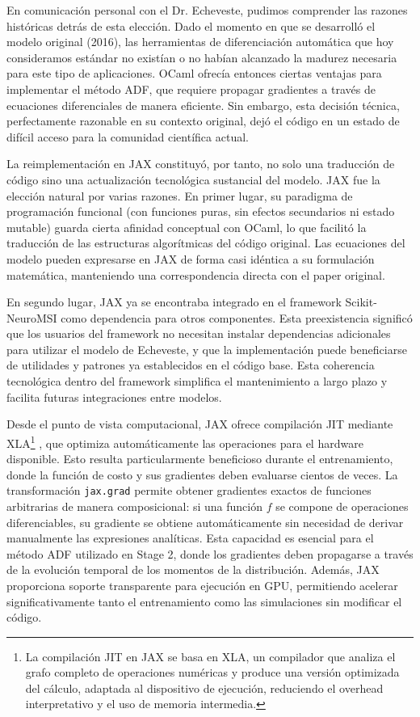 En comunicación personal con el Dr. Echeveste, pudimos comprender las razones históricas detrás de esta elección. Dado el momento en que se desarrolló el modelo original (2016), las herramientas de diferenciación automática que hoy consideramos estándar no existían o no habían alcanzado la madurez necesaria para este tipo de aplicaciones. OCaml ofrecía entonces ciertas ventajas para implementar el método \acrshort{ADF}, que requiere propagar gradientes a través de ecuaciones diferenciales de manera eficiente. Sin embargo, esta decisión técnica, perfectamente razonable en su contexto original, dejó el código en un estado de difícil acceso para la comunidad científica actual.

La reimplementación en JAX constituyó, por tanto, no solo una traducción de código sino una actualización tecnológica sustancial del modelo. JAX fue la elección natural por varias razones. En primer lugar, su paradigma de programación funcional (con funciones puras, sin efectos secundarios ni estado mutable) guarda cierta afinidad conceptual con OCaml, lo que facilitó la traducción de las estructuras algorítmicas del código original. Las ecuaciones del modelo pueden expresarse en JAX de forma casi idéntica a su formulación matemática, manteniendo una correspondencia directa con el paper original.

En segundo lugar, JAX ya se encontraba integrado en el framework Scikit-NeuroMSI como dependencia para otros componentes. Esta preexistencia significó que los usuarios del framework no necesitan instalar dependencias adicionales para utilizar el modelo de Echeveste, y que la implementación puede beneficiarse de utilidades y patrones ya establecidos en el código base. Esta coherencia tecnológica dentro del framework simplifica el mantenimiento a largo plazo y facilita futuras integraciones entre modelos.

Desde el punto de vista computacional, JAX ofrece compilación \acrlong{JIT} mediante \acrshort{XLA}\footnote{
La compilación \acrshort{JIT} en JAX se basa en \acrfull{XLA}, un compilador que analiza el grafo completo de operaciones numéricas y produce una versión optimizada del cálculo, adaptada al dispositivo de ejecución, reduciendo el overhead interpretativo y el uso de memoria intermedia.
}
, que optimiza automáticamente las operaciones para el hardware disponible. Esto resulta particularmente beneficioso durante el entrenamiento, donde la función de costo y sus gradientes deben evaluarse cientos de veces. La transformación \texttt{jax.grad} permite obtener gradientes exactos de funciones arbitrarias de manera composicional: si una función $f$ se compone de operaciones diferenciables, su gradiente se obtiene automáticamente sin necesidad de derivar manualmente las expresiones analíticas. Esta capacidad es esencial para el método \acrshort{ADF} utilizado en Stage 2, donde los gradientes deben propagarse a través de la evolución temporal de los momentos de la distribución. Además, JAX proporciona soporte transparente para ejecución en \acrshort{GPU}, permitiendo acelerar significativamente tanto el entrenamiento como las simulaciones sin modificar el código.

